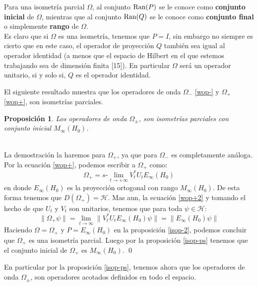 \documentclass[12pt]{book}
\numberwithin{equation}{chapter}
\newtheorem{proposition}[theorem]{Proposici\'on}
\def\n{\noindent}
\def\rar{\rightarrow}
\def\H{\mathcal{H}}
\def\O{\Omega}
\def\slim{s\mbox{-}\lim}
\begin{document}
\vspace{5 mm}

Para una isometr\'ia parcial $\O$, al conjunto $\hbox{Ran}(P)$ se le conoce como {\bf conjunto inicial} de $\O$, mientras que al conjunto $\hbox{Ran}(Q)$ se le conoce como {\bf conjunto final} o simplemente {\bf rango} de $\O$.\\
Es claro que si $\O$ es una isometr\'ia, tenemos que $P=I$, sin embargo no siempre es cierto que en este caso, el operador de proyecci\'on $Q$ tambi\'en sea igual al operador identidad (a menos que el espacio de Hilbert en el que estemos trabajando sea de dimensi\'on finita [15]). En particular $\O$ ser\'a un operador unitario, si y solo si, $Q$ es el operador identidad.

El siguiente resultado muestra que los operadores de onda $\O_{-}$ \eqref{wop-} y $\O_{+}$ \eqref{wop+}, son isometr\'ias parciales. 

\begin{proposition}
Los operadores de onda $\O_{\pm}$, son isometr\'ias parciales con conjunto inicial $M_{\infty}(H_{0})$.
\end{proposition}
\n {\bf Demostraci\'on}\\
La demostraci\'on la haremos para $\O_{+}$, ya que para $\O_{-}$ es completamente an\'aloga.\\
Por la ecuaci\'on \eqref{wop+}, podemos escribir a $\O_{+}$ como:
\begin{equation}\label{wop+2}
\O_{+} = \slim_{t \rar + \infty} V_{t}^{*} U_{t} E_{\infty}(H_{0})
\end{equation}
en donde $E_{\infty}(H_{0})$ es la proyecci\'on ortogonal con rango $M_{\infty}(H_{0})$. De esta forma tenemos que $D( \O_{+} )= \H$. Mas aun, la ecuaci\'on \eqref{wop+2} y tomando el hecho de que $U_{t}$ y $V_{t}$ son unitarios, tenemos que para toda $\psi \in \H$:
$$ \| \O_{+} \psi \| = \lim_{t \rar \infty} \| V_{t}^{*} U_{t} E_{\infty}(H_{0}) \psi \|= \| E_{\infty}(H_{0}) \psi \| $$
Haciendo $\O= \O_{+}$ y $P = E_{\infty}(H_{0}) $ en la proposici\'on \ref{isop-2}, podemos concluir que $\O_{+}$ es una isometr\'ia parcial. Luego por la proposici\'on \ref{isop-ps} tenemos que el conjunto inicial de $\O_{+}$ es $M_{\infty}(H_{0})$. \qed

\vspace{5 mm}

En particular por la proposici\'on \ref{isop-ps}, tenemos ahora que los operadores de onda $\O_{\pm}$, son operadores acotados definidos en todo el espacio.\\
\end{document}
